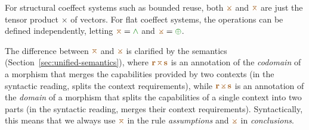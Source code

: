 For structural coeffect systems such as bounded reuse, both $\apar$ and $\azip$ are
just the tensor product $\times$ of vectors. For flat coeffect systems, the operations
can be defined independently, letting $\azip=\czip$ and $\apar=\cpar$.

The difference between $\azip$ and $\apar$ is clarified by the semantics (Sec\-tion~\ref{sec:unified-semantics}), 
where $\aclrd{\textbf{r}}\,\azip\,\aclrd{\textbf{s}}$ is an annotation of the \emph{codomain} of 
a morphism that merges the capabilities provided by two contexts (in the syntactic 
reading, splits the context requirements), while $\aclrd{\textbf{r}}\,\apar\,\aclrd{\textbf{s}}$ 
is an annotation of the \emph{domain} of a morphism that splits the capabilities of a single 
context into two parts (in the syntactic reading, merges their context requirements). 
Syntactically, this means that we always use $\azip$ in the rule \emph{assumptions} and 
$\apar$ in \emph{conclusions}. 


\newcommand{\tystmt}[2]{ (\text{\footnotesize{#1}})~~{#2} }
\newcommand{\ctxtrans}[3]{ #2 \rightsquigarrow #1, #3 }
\newcommand{\ctxtransnl}[3]{ \begin{array}{l} #2 \rightsquigarrow\\ #1, #3 \end{array}}

